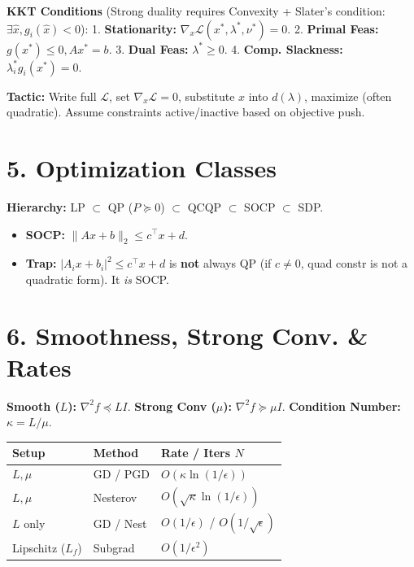 \textbf{KKT Conditions} (Strong duality requires Convexity + Slater's
condition: $\exists \hat{x}, g_i(\hat{x}) < 0$):
1. \textbf{Stationarity:} $\nabla_x \mathcal{L}(x^*, \lambda^*, \nu^*) = 0$.
2. \textbf{Primal Feas:} $g(x^*) \le 0, Ax^*=b$.
3. \textbf{Dual Feas:} $\lambda^* \ge 0$.
4. \textbf{Comp. Slackness:} $\lambda_i^* g_i(x^*) = 0$.

\textbf{Tactic:} Write full $\mathcal{L}$, set
$\nabla_x\mathcal{L}=0$, substitute $x$ into $d(\lambda)$, maximize
(often quadratic). Assume constraints active/inactive based on objective push.

\section*{5. Optimization Classes}
\textbf{Hierarchy:} LP $\subset$ QP ($P\succeq0$) $\subset$ QCQP
$\subset$ SOCP $\subset$ SDP.
\begin{itemize}[leftmargin=*]
  \item \textbf{SOCP:} $\|Ax+b\|_2 \le c^\top x + d$.
  \item \textbf{Trap:} $|A_i x + b_i|^2 \le c^\top x + d$ is
    \textbf{not} always QP (if $c \neq 0$, quad constr is not a
    quadratic form). It \textit{is} SOCP.
\end{itemize}

\section*{6. Smoothness, Strong Conv. \& Rates}
\textbf{Smooth ($L$):} $\nabla^2 f \preceq LI$. \textbf{Strong Conv
($\mu$):} $\nabla^2 f \succeq \mu I$.
\textbf{Condition Number:} $\kappa = L/\mu$.

\begin{table}[H]
  \footnotesize
  \begin{tabular}{@{}lll@{}}
    \toprule
    \textbf{Setup} & \textbf{Method} & \textbf{Rate / Iters $N$} \\ \midrule
    $L, \mu$ & GD / PGD & $O(\kappa \ln(1/\epsilon))$ \\
    $L, \mu$ & Nesterov & $O(\sqrt{\kappa} \ln(1/\epsilon))$ \\
    $L$ only & GD / Nest & $O(1/\epsilon)$ / $O(1/\sqrt{\epsilon})$ \\
    Lipschitz ($L_f$) & Subgrad & $O(1/\epsilon^2)$ \\ \bottomrule
  \end{tabular}
\end{table}

